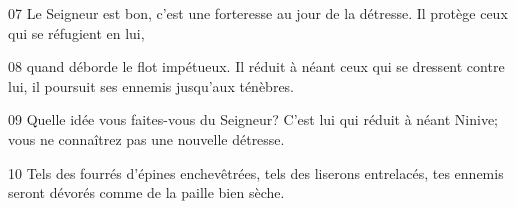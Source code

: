 
07 Le Seigneur est bon, c’est une forteresse au jour de la détresse. Il protège ceux qui se réfugient en lui,

08 quand déborde le flot impétueux. Il réduit à néant ceux qui se dressent contre lui, il poursuit ses ennemis jusqu’aux ténèbres.

09 Quelle idée vous faites-vous du Seigneur? C’est lui qui réduit à néant Ninive; vous ne connaîtrez pas une nouvelle détresse.

10 Tels des fourrés d’épines enchevêtrées, tels des liserons entrelacés, tes ennemis seront dévorés comme de la paille bien sèche.